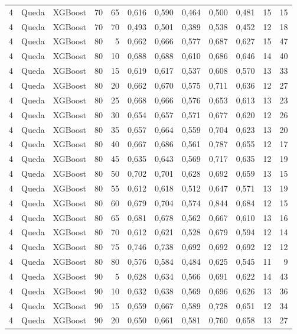 \begin{longtable}{@{}rllrrrrrrrrr@{}}
4 & Queda & XGBoost & 70 & 65 & 0,616 & 0,590 & 0,464 & 0,500 & 0,481 & 15 & 15 \\
4 & Queda & XGBoost & 70 & 70 & 0,493 & 0,501 & 0,389 & 0,538 & 0,452 & 12 & 18 \\
4 & Queda & XGBoost & 80 & 5 & 0,662 & 0,666 & 0,577 & 0,687 & 0,627 & 15 & 47 \\
4 & Queda & XGBoost & 80 & 10 & 0,688 & 0,688 & 0,610 & 0,686 & 0,646 & 14 & 40 \\
4 & Queda & XGBoost & 80 & 15 & 0,619 & 0,617 & 0,537 & 0,608 & 0,570 & 13 & 33 \\
4 & Queda & XGBoost & 80 & 20 & 0,662 & 0,670 & 0,575 & 0,711 & 0,636 & 12 & 27 \\
4 & Queda & XGBoost & 80 & 25 & 0,668 & 0,666 & 0,576 & 0,653 & 0,613 & 13 & 23 \\
4 & Queda & XGBoost & 80 & 30 & 0,654 & 0,657 & 0,571 & 0,677 & 0,620 & 12 & 26 \\
4 & Queda & XGBoost & 80 & 35 & 0,657 & 0,664 & 0,559 & 0,704 & 0,623 & 13 & 20 \\
4 & Queda & XGBoost & 80 & 40 & 0,667 & 0,686 & 0,561 & 0,787 & 0,655 & 12 & 17 \\
4 & Queda & XGBoost & 80 & 45 & 0,635 & 0,643 & 0,569 & 0,717 & 0,635 & 12 & 19 \\
4 & Queda & XGBoost & 80 & 50 & 0,702 & 0,701 & 0,628 & 0,692 & 0,659 & 13 & 15 \\
4 & Queda & XGBoost & 80 & 55 & 0,612 & 0,618 & 0,512 & 0,647 & 0,571 & 13 & 19 \\
4 & Queda & XGBoost & 80 & 60 & 0,679 & 0,704 & 0,574 & 0,844 & 0,684 & 12 & 15 \\
4 & Queda & XGBoost & 80 & 65 & 0,681 & 0,678 & 0,562 & 0,667 & 0,610 & 13 & 16 \\
4 & Queda & XGBoost & 80 & 70 & 0,612 & 0,621 & 0,528 & 0,679 & 0,594 & 12 & 14 \\
4 & Queda & XGBoost & 80 & 75 & 0,746 & 0,738 & 0,692 & 0,692 & 0,692 & 12 & 12 \\
4 & Queda & XGBoost & 80 & 80 & 0,576 & 0,584 & 0,484 & 0,625 & 0,545 & 11 & 9 \\
4 & Queda & XGBoost & 90 & 5 & 0,628 & 0,634 & 0,566 & 0,691 & 0,622 & 14 & 43 \\
4 & Queda & XGBoost & 90 & 10 & 0,632 & 0,638 & 0,569 & 0,696 & 0,626 & 13 & 36 \\
4 & Queda & XGBoost & 90 & 15 & 0,659 & 0,667 & 0,589 & 0,728 & 0,651 & 12 & 34 \\
4 & Queda & XGBoost & 90 & 20 & 0,650 & 0,661 & 0,581 & 0,760 & 0,658 & 13 & 27 \\

\end{longtable}
